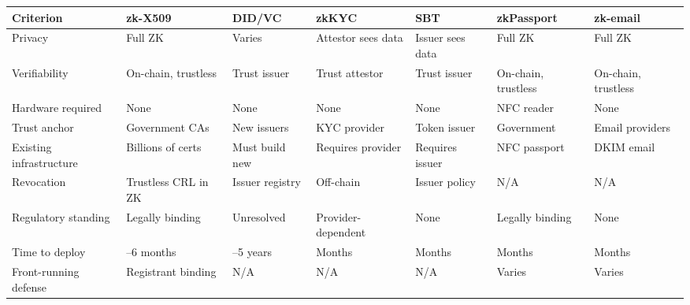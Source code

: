\documentclass[11pt, a4paper]{article}
\begin{document}
\begin{longtable}[]{@{}
  >{\raggedright\arraybackslash}p{}
  >{\raggedright\arraybackslash}p{}
  >{\raggedright\arraybackslash}p{}
  >{\raggedright\arraybackslash}p{}
  >{\raggedright\arraybackslash}p{}
  >{\raggedright\arraybackslash}p{}
  >{\raggedright\arraybackslash}p{}@{}}
\toprule\noalign{}
\begin{minipage}[b]{\linewidth}\raggedright
Criterion
\end{minipage} & \begin{minipage}[b]{\linewidth}\raggedright
zk-X509
\end{minipage} & \begin{minipage}[b]{\linewidth}\raggedright
DID/VC \cite{ref13}
\end{minipage} & \begin{minipage}[b]{\linewidth}\raggedright
zkKYC
\end{minipage} & \begin{minipage}[b]{\linewidth}\raggedright
SBT \cite{ref10}
\end{minipage} & \begin{minipage}[b]{\linewidth}\raggedright
zkPassport \cite{ref2}
\end{minipage} & \begin{minipage}[b]{\linewidth}\raggedright
zk-email \cite{ref9}
\end{minipage} \\
\midrule\noalign{}
\endhead
\bottomrule\noalign{}
\endlastfoot
Privacy & Full ZK & Varies & Attestor sees data & Issuer sees data &
Full ZK & Full ZK \\
Verifiability & On-chain, trustless & Trust issuer & Trust attestor &
Trust issuer & On-chain, trustless & On-chain, trustless \\
Hardware required & None & None & None & None & NFC reader & None \\
Trust anchor & Government CAs & New issuers & KYC provider & Token
issuer & Government & Email providers \\
Existing infrastructure & Billions of certs & Must build new & Requires
provider & Requires issuer & NFC passport & DKIM email \\
Revocation & Trustless CRL in ZK & Issuer registry & Off-chain & Issuer
policy & N/A & N/A \\
Regulatory standing & Legally binding & Unresolved & Provider-dependent
& None & Legally binding & None \\
Time to deploy & 3--6 months & 3--5 years & Months & Months & Months &
Months \\
Front-running defense & Registrant binding & N/A & N/A & N/A & Varies &
Varies \\
\end{longtable}
\end{document}

